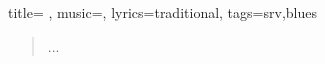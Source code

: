 \documentclass{article}
\begin{document}
\begin{song}{title={%
}, music={}, lyrics={traditional}, tags={srv,blues}}
\RaggedRight
\begin{verse}
          ... \\
        
\end{verse}
\end{song} 
\end{document}
